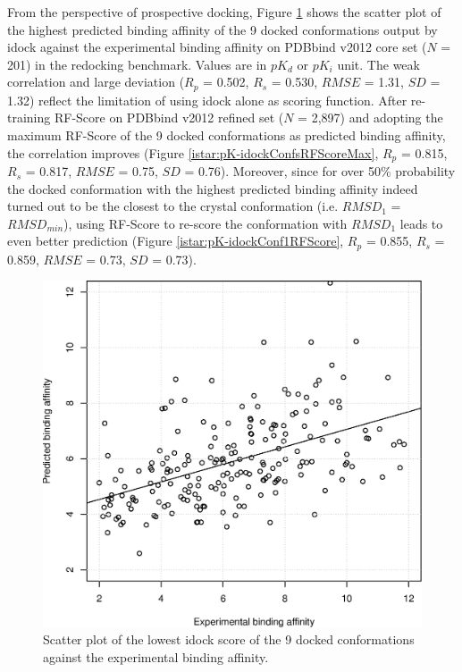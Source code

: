 From the perspective of prospective docking, Figure \ref{istar:pK-idockConf1idock} shows the scatter plot of the highest predicted binding affinity of the 9 docked conformations output by idock against the experimental binding affinity on PDBbind v2012 core set ($N$ = 201) in the redocking benchmark. Values are in $pK_d$ or $pK_i$ unit. The weak correlation and large deviation ($R_p$ = 0.502, $R_s$ = 0.530, $RMSE$ = 1.31, $SD$ = 1.32) reflect the limitation of using idock alone as scoring function. After re-training RF-Score on PDBbind v2012 refined set ($N$ = 2,897) and adopting the maximum RF-Score of the 9 docked conformations as predicted binding affinity, the correlation improves (Figure \ref{istar:pK-idockConfsRFScoreMax}, $R_p$ = 0.815, $R_s$ = 0.817, $RMSE$ = 0.75, $SD$ = 0.76). Moreover, since for over 50\% probability the docked conformation with the highest predicted binding affinity indeed turned out to be the closest to the crystal conformation (i.e. $RMSD_1$ = $RMSD_{min}$), using RF-Score to re-score the conformation with $RMSD_1$ leads to even better prediction (Figure \ref{istar:pK-idockConf1RFScore}, $R_p$ = 0.855, $R_s$ = 0.859, $RMSE$ = 0.73, $SD$ = 0.73).

\begin{figure}
\begin{center}
\includegraphics[width=\linewidth]{../istar/pK-idockConf1idock.eps}
\end{center}
\caption{Scatter plot of the lowest idock score of the 9 docked conformations against the experimental binding affinity.}
\label{istar:pK-idockConf1idock}
\end{figure}

